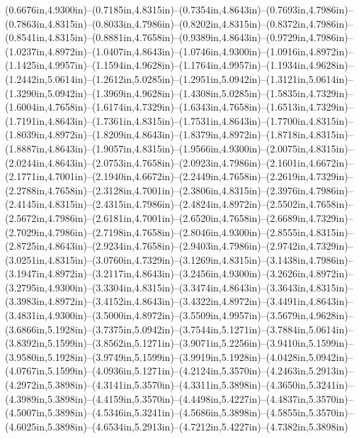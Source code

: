 (0.6676in,4.9300in)--(0.7185in,4.8315in)--(0.7354in,4.8643in)--(0.7693in,4.7986in)--(0.7863in,4.8315in)--(0.8033in,4.7986in)--(0.8202in,4.8315in)--(0.8372in,4.7986in)--(0.8541in,4.8315in)--(0.8881in,4.7658in)--(0.9389in,4.8643in)--(0.9729in,4.7986in)--(1.0237in,4.8972in)--(1.0407in,4.8643in)--(1.0746in,4.9300in)--(1.0916in,4.8972in)--(1.1425in,4.9957in)--(1.1594in,4.9628in)--(1.1764in,4.9957in)--(1.1934in,4.9628in)--(1.2442in,5.0614in)--(1.2612in,5.0285in)--(1.2951in,5.0942in)--(1.3121in,5.0614in)--(1.3290in,5.0942in)--(1.3969in,4.9628in)--(1.4308in,5.0285in)--(1.5835in,4.7329in)--(1.6004in,4.7658in)--(1.6174in,4.7329in)--(1.6343in,4.7658in)--(1.6513in,4.7329in)--(1.7191in,4.8643in)--(1.7361in,4.8315in)--(1.7531in,4.8643in)--(1.7700in,4.8315in)--(1.8039in,4.8972in)--(1.8209in,4.8643in)--(1.8379in,4.8972in)--(1.8718in,4.8315in)--(1.8887in,4.8643in)--(1.9057in,4.8315in)--(1.9566in,4.9300in)--(2.0075in,4.8315in)--(2.0244in,4.8643in)--(2.0753in,4.7658in)--(2.0923in,4.7986in)--(2.1601in,4.6672in)--(2.1771in,4.7001in)--(2.1940in,4.6672in)--(2.2449in,4.7658in)--(2.2619in,4.7329in)--(2.2788in,4.7658in)--(2.3128in,4.7001in)--(2.3806in,4.8315in)--(2.3976in,4.7986in)--(2.4145in,4.8315in)--(2.4315in,4.7986in)--(2.4824in,4.8972in)--(2.5502in,4.7658in)--(2.5672in,4.7986in)--(2.6181in,4.7001in)--(2.6520in,4.7658in)--(2.6689in,4.7329in)--(2.7029in,4.7986in)--(2.7198in,4.7658in)--(2.8046in,4.9300in)--(2.8555in,4.8315in)--(2.8725in,4.8643in)--(2.9234in,4.7658in)--(2.9403in,4.7986in)--(2.9742in,4.7329in)--(3.0251in,4.8315in)--(3.0760in,4.7329in)--(3.1269in,4.8315in)--(3.1438in,4.7986in)--(3.1947in,4.8972in)--(3.2117in,4.8643in)--(3.2456in,4.9300in)--(3.2626in,4.8972in)--(3.2795in,4.9300in)--(3.3304in,4.8315in)--(3.3474in,4.8643in)--(3.3643in,4.8315in)--(3.3983in,4.8972in)--(3.4152in,4.8643in)--(3.4322in,4.8972in)--(3.4491in,4.8643in)--(3.4831in,4.9300in)--(3.5000in,4.8972in)--(3.5509in,4.9957in)--(3.5679in,4.9628in)--(3.6866in,5.1928in)--(3.7375in,5.0942in)--(3.7544in,5.1271in)--(3.7884in,5.0614in)--(3.8392in,5.1599in)--(3.8562in,5.1271in)--(3.9071in,5.2256in)--(3.9410in,5.1599in)--(3.9580in,5.1928in)--(3.9749in,5.1599in)--(3.9919in,5.1928in)--(4.0428in,5.0942in)--(4.0767in,5.1599in)--(4.0936in,5.1271in)--(4.2124in,5.3570in)--(4.2463in,5.2913in)--(4.2972in,5.3898in)--(4.3141in,5.3570in)--(4.3311in,5.3898in)--(4.3650in,5.3241in)--(4.3989in,5.3898in)--(4.4159in,5.3570in)--(4.4498in,5.4227in)--(4.4837in,5.3570in)--(4.5007in,5.3898in)--(4.5346in,5.3241in)--(4.5686in,5.3898in)--(4.5855in,5.3570in)--(4.6025in,5.3898in)--(4.6534in,5.2913in)--(4.7212in,5.4227in)--(4.7382in,5.3898in) 